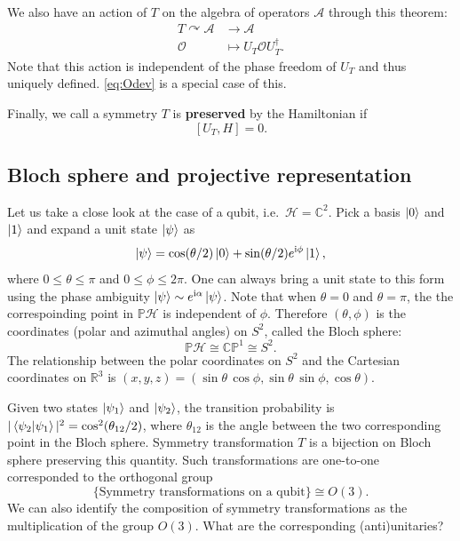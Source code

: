 \documentclass[
]{scrartcl}
\numberwithin{equation}{section}
\renewenvironment{align}{\begin{equation}\begin{aligned}}{\end{aligned}\end{equation}}
\theoremstyle{definition}
\theoremstyle{definition}
\theoremstyle{definition}
\theoremstyle{definition}
\theoremstyle{remark}
\begin{document}
We also have an action of \(T\) on the algebra of operators \(\mathcal{A}\) through this theorem:
\begin{align}
  \label{eq:TonA}
  T \curvearrowright \mathcal{A}  & \to \mathcal{A} \\
  \mathcal{O} & \mapsto U_T \mathcal{O} U^\dagger_T.
\end{align}
Note that this action is independent of the phase freedom of \(U_T\) and thus uniquely defined.
\eqref{eq:Odev} is a special case of this.

Finally, we call a symmetry \(T\) is \textbf{preserved} by the Hamiltonian if
\begin{equation}
  \label{eq:UHcommute}
  [U_T,H] = 0.
\end{equation}

\hypertarget{Bloch}{%
\subsection{Bloch sphere and projective representation}\label{Bloch}}

Let us take a close look at the case of a qubit, i.e.~\(\mathcal{H} = \mathbb{C}^2\).
Pick a basis \(\ket{0}\) and \(\ket{1}\) and expand a unit state \(\ket{\psi}\) as
\begin{equation}
  \label{eq:psiexp}
  \ket{\psi} = \cos(\theta/2) \ket{0} + \sin(\theta/2)e^{\mathrm{i}\phi} \ket{1},
\end{equation}
where \(0\le \theta \le \pi\) and \(0 \le \phi \le 2\pi\).
One can always bring a unit state to this form using the phase ambiguity \(\ket{\psi}\sim e^{\mathrm{i}\alpha}\ket{\psi}\).
Note that when \(\theta = 0\) and \(\theta =\pi\), the the correspoinding point in \(\mathbb{P}\mathcal{H}\) is independent of \(\phi\). Therefore \((\theta,\phi)\) is the coordinates (polar and azimuthal angles) on \(S^2\), called the Bloch sphere:
\begin{equation}
  \label{eq:PHCP1}
  \mathbb{P}\mathcal{H} \cong \mathbb{CP}^1 \cong S^2.
\end{equation}
The relationship between the polar coordinates on \(S^2\) and the Cartesian coordinates on \(\mathbb{R}^3\) is \((x,y,z) = (\sin\theta\,\cos\phi,\sin\theta\,\sin\phi,\cos\theta)\).

Given two states \(\ket{\psi_1}\) and \(\ket{\psi_2}\), the transition probability is \(|\braket{\psi_2|\psi_1}|^2 = \cos^2(\theta_{12}/2)\), where \(\theta_{12}\) is the angle between the two corresponding point in the Bloch sphere.
Symmetry transformation \(T\) is a bijection on Bloch sphere preserving this quantity. Such transformations are one-to-one corresponded to the orthogonal group
\begin{equation}
  \label{eq:TisO3}
  \{\text{Symmetry transformations on a qubit}\} \cong O(3).
\end{equation}
We can also identify the composition of symmetry transformations as the multiplication of the group \(O(3)\).
What are the corresponding (anti)unitaries?
\end{document}
